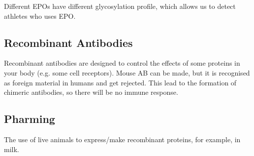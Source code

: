 Different EPOs have different glycosylation profile, which allows us to detect athletes who uses EPO.

\subsection{Recombinant Antibodies}

Recombinant antibodies are designed to control the effects of some proteins in your body (e.g. some cell receptors).
Mouse AB can be made, but it is recognised as foreign material in humans and get rejected.
This lead to the formation of chimeric antibodies, so there will be no immune response.

\begin{center}
\end{center}

\subsection{Pharming}

The use of live animals to express/make recombinant proteins, for example, in milk.

